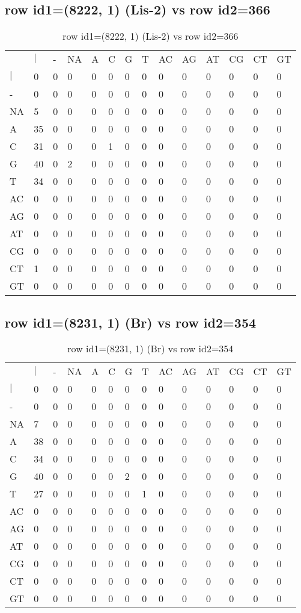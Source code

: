 \subsection{row id1=(8222, 1) (Lis-2) vs row id2=366}
\begin{center}
\begin{longtable}{|l|l|l|l|l|l|l|l|l|l|l|l|l|l|}
\caption{row id1=(8222, 1) (Lis-2) vs row id2=366} \label{table_dm152}\\
\hline
\\
\hline
&$|$&-&NA&A&C&G&T&AC&AG&AT&CG&CT&GT\\
$|$&0&0&0&0&0&0&0&0&0&0&0&0&0\\
-&0&0&0&0&0&0&0&0&0&0&0&0&0\\
NA&5&0&0&0&0&0&0&0&0&0&0&0&0\\
A&35&0&0&0&0&0&0&0&0&0&0&0&0\\
C&31&0&0&0&1&0&0&0&0&0&0&0&0\\
G&40&0&2&0&0&0&0&0&0&0&0&0&0\\
T&34&0&0&0&0&0&0&0&0&0&0&0&0\\
AC&0&0&0&0&0&0&0&0&0&0&0&0&0\\
AG&0&0&0&0&0&0&0&0&0&0&0&0&0\\
AT&0&0&0&0&0&0&0&0&0&0&0&0&0\\
CG&0&0&0&0&0&0&0&0&0&0&0&0&0\\
CT&1&0&0&0&0&0&0&0&0&0&0&0&0\\
GT&0&0&0&0&0&0&0&0&0&0&0&0&0\\
\hline
\end{longtable}
\end{center}

\subsection{row id1=(8231, 1) (Br) vs row id2=354}
\begin{center}
\begin{longtable}{|l|l|l|l|l|l|l|l|l|l|l|l|l|l|}
\caption{row id1=(8231, 1) (Br) vs row id2=354} \label{table_dm154}\\
\hline
\\
\hline
&$|$&-&NA&A&C&G&T&AC&AG&AT&CG&CT&GT\\
$|$&0&0&0&0&0&0&0&0&0&0&0&0&0\\
-&0&0&0&0&0&0&0&0&0&0&0&0&0\\
NA&7&0&0&0&0&0&0&0&0&0&0&0&0\\
A&38&0&0&0&0&0&0&0&0&0&0&0&0\\
C&34&0&0&0&0&0&0&0&0&0&0&0&0\\
G&40&0&0&0&0&2&0&0&0&0&0&0&0\\
T&27&0&0&0&0&0&1&0&0&0&0&0&0\\
AC&0&0&0&0&0&0&0&0&0&0&0&0&0\\
AG&0&0&0&0&0&0&0&0&0&0&0&0&0\\
AT&0&0&0&0&0&0&0&0&0&0&0&0&0\\
CG&0&0&0&0&0&0&0&0&0&0&0&0&0\\
CT&0&0&0&0&0&0&0&0&0&0&0&0&0\\
GT&0&0&0&0&0&0&0&0&0&0&0&0&0\\
\hline
\end{longtable}
\end{center}

